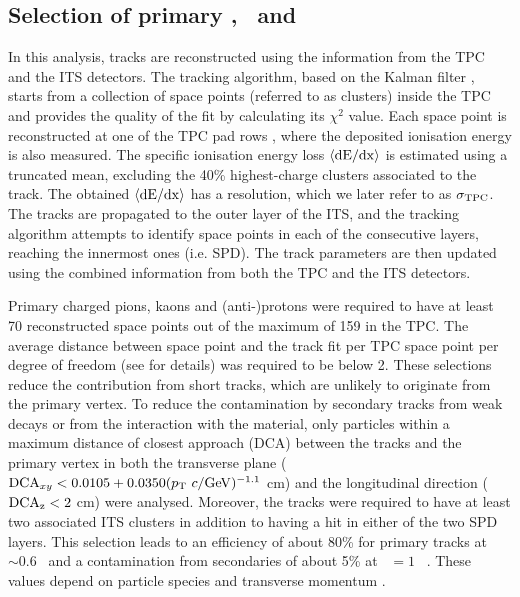 \subsection{Selection of primary \pion, \kaon~and \proton}
\label{SubSec:Track}
In this analysis, tracks are reconstructed using the information from the TPC and the ITS detectors. The tracking algorithm, based on the Kalman filter \cite{Billoir:1983mz,Billoir:1985nq}, starts from a collection of space points (referred to as clusters) inside the TPC and provides the quality of the fit by calculating its $\chi^{2}$ value. Each space point is reconstructed at one of the TPC pad rows \cite{Aamodt:2008zz}, where the deposited ionisation energy is also measured. The specific ionisation energy loss $\langle{\rm{dE}/dx}\rangle$ is estimated using a truncated mean, excluding the 40\% highest-charge clusters associated to the track. The obtained $\langle{\rm{dE}/dx}\rangle$ has a resolution, which we later refer to as $\sigma_{\rm{TPC}}$. The tracks are propagated to the outer layer of the ITS, and the tracking algorithm attempts to identify space points in each of the consecutive layers, reaching the innermost ones (i.e. SPD). The track parameters are then updated using the combined information from both the TPC and the ITS detectors. 

Primary charged pions, kaons and (anti-)protons were required to have at least 70 reconstructed space points out of the maximum of 159 in the TPC. The average distance between space point and the track fit per TPC space point per degree of freedom (see \cite{Abelev:2014ffa} for details) was required to be below 2. These selections reduce the contribution from short tracks, which are unlikely to originate from the primary vertex. To reduce the contamination by secondary tracks from weak decays or from the interaction with the material, only particles within a maximum distance of closest approach (DCA) between the tracks and the primary vertex in both the transverse plane (${\rm{DCA}}_{xy} < 0.0105 + 0.0350(p_{\rm{T}}~c/{\rm{GeV}})^{-1.1}$ cm) and the longitudinal direction ($\rm{DCA}_{z} < 2$ cm) were analysed. Moreover, the tracks were required to have at least two associated ITS clusters in addition to having a hit in either of the two SPD layers. This selection leads to an efficiency of about 80\% for primary tracks at \pT~$\sim0.6$ \GeV~and a contamination from secondaries of about 5\% at \pT~$=1$ \GeV~\cite{Abelev:2013vea}. These values depend on particle species and transverse momentum \cite{Abelev:2013vea}. 

